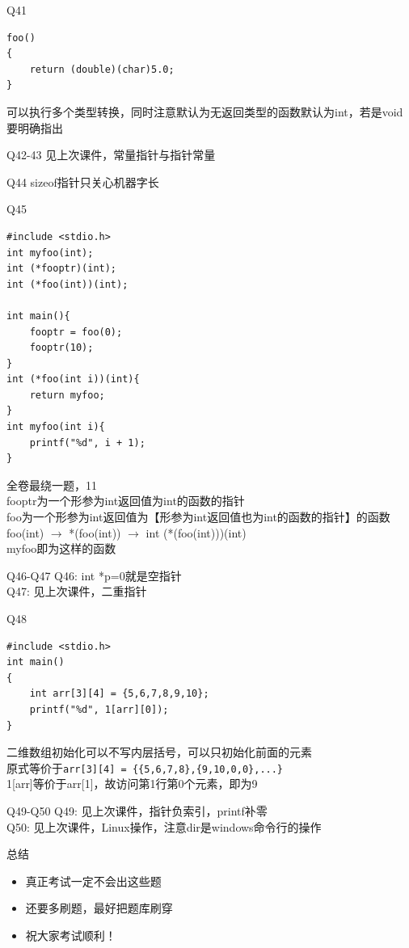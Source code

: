\documentclass{myslide}
\begin{document}
\begin{frame}[fragile]{Q41}
\begin{lstlisting}
foo()
{
    return (double)(char)5.0;
}
\end{lstlisting}
可以执行多个类型转换，同时注意默认为无返回类型的函数默认为int，若是void要明确指出
\end{frame}

\begin{frame}{Q42-43}
见上次课件，常量指针与指针常量
\end{frame}

\begin{frame}{Q44}
sizeof指针只关心机器字长
\end{frame}

\begin{frame}[fragile]{Q45}
\fontsm
\begin{lstlisting}
#include <stdio.h>
int myfoo(int);
int (*fooptr)(int);
int (*foo(int))(int);

int main(){
    fooptr = foo(0);
    fooptr(10);
}
int (*foo(int i))(int){
    return myfoo;
}
int myfoo(int i){
    printf("%d", i + 1);
}
\end{lstlisting}
全卷最绕一题，11\\
fooptr为一个形参为int返回值为int的函数的指针\\
foo为一个形参为int返回值为【形参为int返回值也为int的函数的指针】的函数\\
foo(int) $\to$ *(foo(int)) $\to$ int (*(foo(int)))(int)\\
myfoo即为这样的函数
\end{frame}

\begin{frame}{Q46-Q47}
Q46: int *p=0就是空指针\\
Q47: 见上次课件，二重指针
\end{frame}

\begin{frame}[fragile]{Q48}
\begin{lstlisting}
#include <stdio.h>
int main()
{
    int arr[3][4] = {5,6,7,8,9,10};
    printf("%d", 1[arr][0]);
}
\end{lstlisting}
二维数组初始化可以不写内层括号，可以只初始化前面的元素\\
原式等价于\verb'arr[3][4] = {{5,6,7,8},{9,10,0,0},...}'\\
1[arr]等价于arr[1]，故访问第1行第0个元素，即为9
\end{frame}

\begin{frame}{Q49-Q50}
Q49: 见上次课件，指针负索引，printf补零\\
Q50: 见上次课件，Linux操作，注意dir是windows命令行的操作
\end{frame}

\begin{frame}{总结}
\begin{itemize}[<+->]
	\item 真正考试一定不会出这些题
	\item 还要多刷题，最好把题库刷穿
	\item 祝大家考试顺利！
\end{itemize}
\end{frame}
\end{document}
